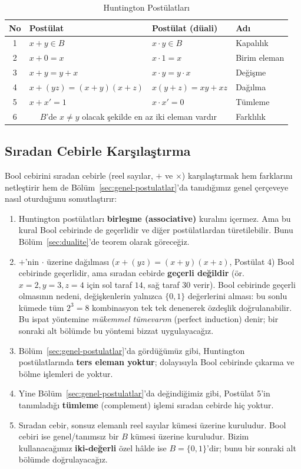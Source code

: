 \begin{table}[h]
\centering
\begin{tabular}{clll}
\toprule
No & Postülat & Postülat (düali) & Adı \\
\midrule
1 & $x+y\in B$ & $x\cdot y\in B$ & Kapalılık \\
2 & $x+0=x$ & $x\cdot 1=x$ & Birim eleman \\
3 & $x+y=y+x$ & $x\cdot y=y\cdot x$ & Değişme \\
4 & $x+(yz)=(x+y)(x+z)$ & $x(y+z)=xy+xz$ & Dağılma \\
5 & $x+x'=1$ & $x\cdot x'=0$ & Tümleme \\
6 & \multicolumn{2}{c}{$B$'de $x\neq y$ olacak şekilde en az iki eleman vardır} & Farklılık \\
\bottomrule
\end{tabular}
\caption{Huntington Postülatları}
\label{tab:huntington}
\end{table}

\subsection{Sıradan Cebirle Karşılaştırma}
\label{sec:siradan-cebir-karsilastirma}

Bool cebirini sıradan cebirle (reel sayılar, $+$ ve $\times$) karşılaştırmak hem farklarını
netleştirir hem de Bölüm~\ref{sec:genel-postulatlar}'da tanıdığımız genel çerçeveye nasıl
oturduğunu somutlaştırır:

\begin{enumerate}[nosep, leftmargin=*]
    \item Huntington postülatları \textbf{birleşme (associative)} kuralını içermez. Ama bu
    kural Bool cebirinde de geçerlidir ve diğer postülatlardan türetilebilir. Bunu
    Bölüm~\ref{sec:dualite}'de teorem olarak göreceğiz.
    \item $+$'nin $\cdot$ üzerine dağılması ($x+(yz)=(x+y)(x+z)$, Postülat 4) Bool cebirinde
    geçerlidir, ama sıradan cebirde \textbf{geçerli değildir} (ör.\ $x{=}2,y{=}3,z{=}4$ için
    sol taraf $14$, sağ taraf $30$ verir). Bool cebirinde geçerli olmasının nedeni,
    değişkenlerin yalnızca $\{0,1\}$ değerlerini alması: bu sonlu kümede tüm $2^3=8$
    kombinasyon tek tek denenerek özdeşlik doğrulanabilir. Bu ispat yöntemine \emph{mükemmel
    tümevarım} (perfect induction) denir; bir sonraki alt bölümde bu yöntemi bizzat
    uygulayacağız.
    \item Bölüm~\ref{sec:genel-postulatlar}'da gördüğümüz gibi, Huntington postülatlarında
    \textbf{ters eleman yoktur}; dolayısıyla Bool cebirinde çıkarma ve bölme işlemleri de
    yoktur.
    \item Yine Bölüm~\ref{sec:genel-postulatlar}'da değindiğimiz gibi, Postülat 5'in tanımladığı
    \textbf{tümleme} (complement) işlemi sıradan cebirde hiç yoktur.
    \item Sıradan cebir, sonsuz elemanlı reel sayılar kümesi üzerine kuruludur. Bool cebiri ise
    genel/tanımsız bir $B$ kümesi üzerine kuruludur. Bizim kullanacağımız
    \textbf{iki-değerli} özel hâlde ise $B=\{0,1\}$'dir; bunu bir sonraki alt bölümde doğrulayacağız.
\end{enumerate}

